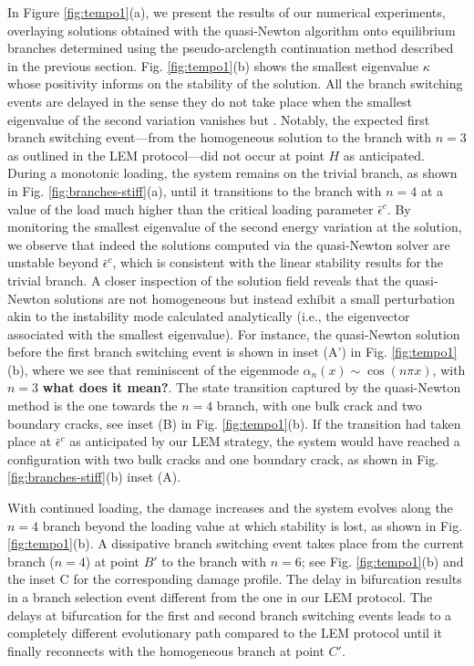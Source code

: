 In Figure \ref{fig:tempo1}(a), we present the results of our numerical experiments, overlaying solutions obtained with the quasi-Newton algorithm onto equilibrium branches determined using the pseudo-arclength continuation method described in the previous section. Fig. \ref{fig:tempo1}(b) shows the smallest eigenvalue $\kappa$ whose positivity informs on the stability of the solution. All the branch switching events are delayed in the sense they do not take place when the smallest eigenvalue of the second variation vanishes but . Notably, the expected first branch switching event—from the {homogeneous} solution to the branch with \(n=3\) as outlined in the LEM protocol—did not occur at point $H$ as anticipated. During a monotonic loading, the system remains on the trivial branch, as shown in Fig. \ref{fig:branches-stiff}(a), until it transitions to the branch with \(n=4\) at a value of the load much higher than the critical loading parameter \(\bar{\epsilon}^c\). By monitoring the smallest eigenvalue of the second energy variation at the solution, we observe that indeed the solutions computed via the quasi-Newton solver are unstable beyond \(\bar{\epsilon}^c\), which is consistent with the linear stability results for the trivial branch. A closer inspection of the solution field reveals that the quasi-Newton solutions are not homogeneous but instead exhibit a small perturbation akin to the instability mode calculated analytically (i.e., the eigenvector associated with the smallest eigenvalue). For instance, the  quasi-Newton solution before the first branch switching event is shown in inset (A') in Fig. \ref{fig:tempo1}(b), where we see that  reminiscent of the eigenmode \(\alpha_n(x) \sim \cos(n\pi x)\),  with \(n=3\) \textbf{what does it mean?}. The state transition captured by the quasi-Newton method is the one towards the  \(n=4\) branch, with one bulk crack and two boundary cracks, see inset (B) in Fig. \ref{fig:tempo1}(b). If the transition had taken place at \(\bar{\epsilon}^c\) as anticipated by our LEM strategy, the system would have reached a configuration with two bulk cracks and one boundary crack, as shown in Fig. \ref{fig:branches-stiff}(b) inset (A).

With continued loading, the damage increases and the system evolves along the \(n=4\) branch beyond the loading value at which stability is lost, as shown in Fig. \ref{fig:tempo1}(b). A dissipative branch switching event takes place from the current branch (\(n=4\)) at point \(B'\) to the branch with \(n=6\); see Fig. \ref{fig:tempo1}(b) and the inset C for the corresponding damage profile. The delay in bifurcation results in a branch selection event different from the one in our LEM protocol. The delays at bifurcation for the first and second branch switching events leads to a completely different evolutionary path compared to the LEM protocol until it finally reconnects with the homogeneous branch at point \(C'\).

